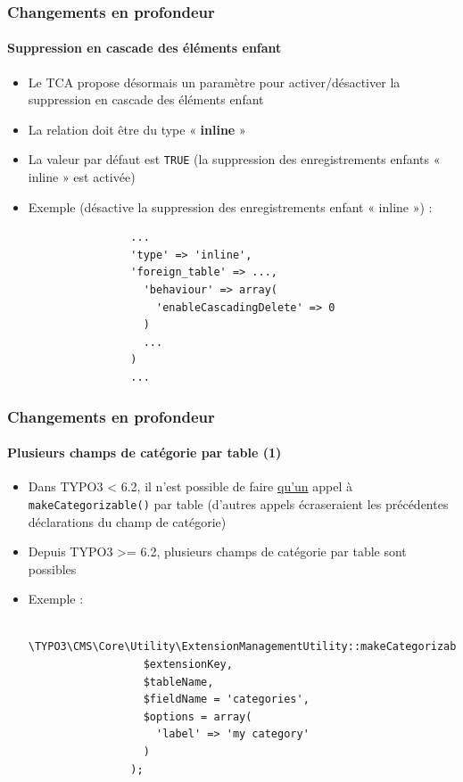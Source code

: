 
\begin{frame}[fragile]
	\frametitle{Changements en profondeur}
	\framesubtitle{Suppression en cascade des éléments enfant}

	\begin{itemize}
		\item Le TCA propose désormais un paramètre pour activer/désactiver la suppression en cascade des éléments enfant
		\item La relation doit être du type « \textbf{inline} »
		\item La valeur par défaut est \texttt{TRUE} (la suppression des enregistrements enfants « inline » est activée)
		\item Exemple (désactive la suppression des enregistrements enfant\newline
				« inline ») :

			\begin{lstlisting}
				...
				'type' => 'inline',
				'foreign_table' => ...,
				  'behaviour' => array(
				    'enableCascadingDelete' => 0
				  )
				  ...
				)
				...
			\end{lstlisting}

	\end{itemize}

\end{frame}


\begin{frame}[fragile]
	\frametitle{Changements en profondeur}
	\framesubtitle{Plusieurs champs de catégorie par table (1)}

	\begin{itemize}
		\item Dans TYPO3 < 6.2, il n'est possible de faire \underline{qu'un} appel à \texttt{makeCategorizable()} par table
			(d'autres appels écraseraient les précédentes déclarations du champ de catégorie)
		\item Depuis TYPO3 >= 6.2, plusieurs champs de catégorie par table sont possibles
		\item Exemple :

			\begin{lstlisting}
				\TYPO3\CMS\Core\Utility\ExtensionManagementUtility::makeCategorizable(
				  $extensionKey,
				  $tableName,
				  $fieldName = 'categories',
				  $options = array(
				  	'label' => 'my category'
				  )
				);
			\end{lstlisting}

	\end{itemize}

\end{frame}

